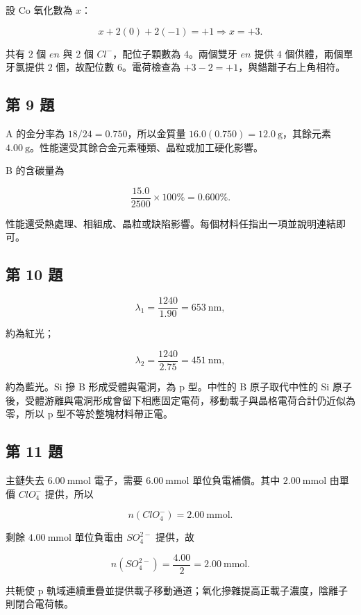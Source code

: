 \documentclass[11pt,a4paper]{article}
\begin{document}
設 Co 氧化數為 \(x\)：

\[
x+2(0)+2(-1)=+1\Rightarrow x=+3.
\]

共有 \(2\) 個 \(en\) 與 \(2\) 個 \(Cl^-\)，配位子顆數為 \(4\)。兩個雙牙 \(en\) 提供 \(4\) 個供體，兩個單牙氯提供 \(2\) 個，故配位數 \(6\)。電荷檢查為 \(+3-2=+1\)，與錯離子右上角相符。

\subsection{第 9 題}\label{ux7b2c-9-ux984c}

A 的金分率為 \(18/24=0.750\)，所以金質量 \(16.0(0.750)=12.0\ \mathrm{g}\)，其餘元素 \(4.00\ \mathrm{g}\)。性能還受其餘合金元素種類、晶粒或加工硬化影響。

B 的含碳量為

\[
\frac{15.0}{2500}\times100\%=0.600\%.
\]

性能還受熱處理、相組成、晶粒或缺陷影響。每個材料任指出一項並說明連結即可。

\subsection{第 10 題}\label{ux7b2c-10-ux984c}

\[
\lambda_1=\frac{1240}{1.90}=653\ \mathrm{nm},
\]

約為紅光；

\[
\lambda_2=\frac{1240}{2.75}=451\ \mathrm{nm},
\]

約為藍光。Si 摻 B 形成受體與電洞，為 p 型。中性的 B 原子取代中性的 Si 原子後，受體游離與電洞形成會留下相應固定電荷，移動載子與晶格電荷合計仍近似為零，所以 p 型不等於整塊材料帶正電。

\subsection{第 11 題}\label{ux7b2c-11-ux984c}

主鏈失去 \(6.00\ \mathrm{mmol}\) 電子，需要 \(6.00\ \mathrm{mmol}\) 單位負電補償。其中 \(2.00\ \mathrm{mmol}\) 由單價 \(ClO_4^-\) 提供，所以

\[
n(ClO_4^-)=2.00\ \mathrm{mmol}.
\]

剩餘 \(4.00\ \mathrm{mmol}\) 單位負電由 \(SO_4^{2-}\) 提供，故

\[
n(SO_4^{2-})=\frac{4.00}{2}=2.00\ \mathrm{mmol}.
\]

共軛使 p 軌域連續重疊並提供載子移動通道；氧化摻雜提高正載子濃度，陰離子則閉合電荷帳。
\end{document}
